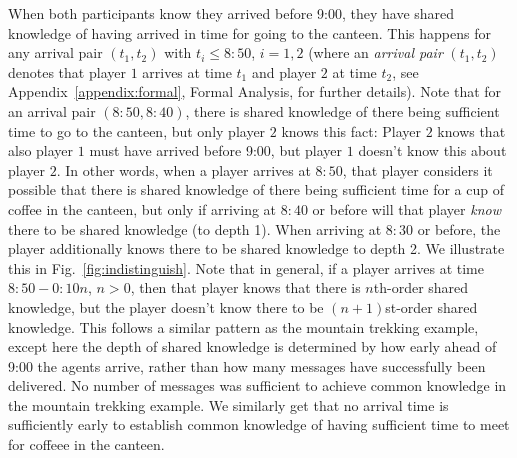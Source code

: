 When both participants know they arrived before 9:00, they have shared knowledge of having arrived in time for going to the canteen. This happens for any arrival pair $(t_1,t_2)$ with $t_i \leq 8{:}50$, $i=1,2$ (where an \emph{arrival pair} $(t_1,t_2)$ denotes that player $1$ arrives at time $t_1$ and player $2$ at time $t_2$, see Appendix~\ref{appendix:formal}, Formal Analysis, for further details). Note that for an arrival pair $(8{:}50,8{:}40)$, there is shared knowledge of there being sufficient time to go to the canteen, but only player $2$ knows this fact: Player $2$ knows that also player $1$ must have arrived before 9{:}00, but player $1$ doesn't know this about player $2$. In other words, when a player arrives at $8{:}50$, that player considers it possible that there is shared knowledge of there being sufficient time for a cup of coffee in the canteen, but only if arriving at $8{:}40$ or before will that player \emph{know} there to be shared knowledge (to depth 1). When arriving at $8{:}30$ or before, the player additionally knows there to be shared knowledge to depth 2. We illustrate this in Fig.~\ref{fig:indistinguish}. Note that in general, if a player arrives at time $8{:}50-0{:}10n$, $n>0$, then that player knows that there is $n$th-order shared knowledge, but the player doesn't know there to be $(n+1)$st-order shared knowledge. This follows a similar pattern as the mountain trekking example, except here the depth of shared knowledge is determined by how early ahead of 9:00 the agents arrive, rather than how many messages have successfully been delivered. No number of messages was sufficient to achieve common knowledge in the mountain trekking example. We similarly get that no arrival time is sufficiently early to establish common knowledge of having sufficient time to meet for coffeee in the canteen. 

